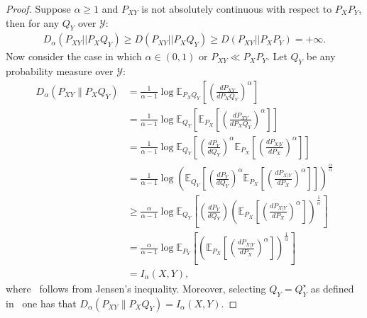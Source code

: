 \documentclass{article}
\numberwithin{theorem}{section}
\numberwithin{example}{section}
\numberwithin{remark}{section}
\numberwithin{definition}{section}
\newcommand{\E}{\mathbb{E}}
\newcommand{\Y}{\mathcal{Y}}
\begin{document}
\begin{proof}
Suppose $\alpha \geq 1$ and $P_{XY}$ is not absolutely continuous with respect to $P_X P_Y$, then for any $Q_Y$ over $\Y$:
\begin{align}
    D_\alpha(P_{XY} || P_X Q_Y) \geq D (P_{XY} || P_X Q_Y) \geq D(P_{XY} || P_X P_Y) = + \infty.
\end{align}
Now consider the case in which $\alpha \in (0,1)$ or $P_{XY} \ll P_X P_Y$. Let $Q_Y$ be any probability measure over $\Y$:
    \begin{align}
        D_\alpha(P_{XY}\|P_XQ_Y) &= \frac{1}{\alpha-1} \log \E_{P_XQ_Y}\left[\left(\frac{dP_{XY}}{dP_XQ_Y}\right)^\alpha\right]\\
        &= \frac{1}{\alpha-1} \log \E_{Q_Y}\left[ \E_{P_X}\left[\left(\frac{dP_{XY}}{dP_XQ_Y}\right)^\alpha\right]\right]\\
        &= \frac{1}{\alpha-1} \log \E_{Q_Y}\left[ \left(\frac{dP_Y}{dQ_Y}\right)^\alpha\E_{P_X}\left[\left(\frac{dP_{X|Y}}{dP_X}\right)^\alpha\right]\right] \\
        &= \frac{1}{\alpha-1} \log \left(\E_{Q_Y}\left[ \left(\frac{dP_Y}{dQ_Y}\right)^\alpha\E_{P_X}\left[\left(\frac{dP_{X|Y}}{dP_X}\right)^\alpha\right]\right] \right)^\frac\alpha\alpha \\
        & \geq \frac{\alpha}{\alpha-1} \log\E_{Q_Y}\left[ \left(\frac{dP_Y}{dQ_Y}\right)\left(\E_{P_X}\left[\left(\frac{dP_{X|Y}}{dP_X}\right)^\alpha\right]\right)^\frac1\alpha\right] \label{eq:jensenProofIalphaClosedForm}\\
        &= \frac{\alpha}{\alpha-1} \log\E_{P_Y}\left[\left(\E_{P_X}\left[\left(\frac{dP_{X|Y}}{dP_X}\right)^\alpha\right]\right)^\frac1\alpha\right] \\
        &= I_\alpha(X,Y),
    \end{align}
    where~ follows from Jensen's inequality. Moreover, selecting $Q_Y=Q_Y^\star$ as defined in~ one has that $D_\alpha(P_{XY}\|P_XQ_Y)=I_\alpha(X,Y)$.


\end{proof}
\end{document}

